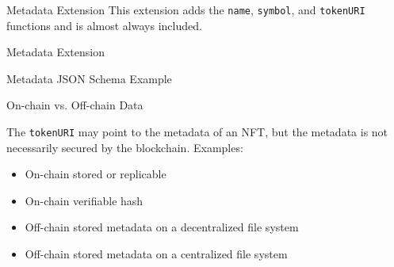 \documentclass[handout]{beamer}
\begin{document}
\begin{frame}{Metadata Extension}
	This extension adds the \texttt{name}, \texttt{symbol}, and \texttt{tokenURI} functions and is almost always included.
\vspace{0.5em}
	\begin{samplecode}{Metadata Extension}
		
	\end{samplecode}
\end{frame}

\begin{frame}{Metadata JSON Schema Example}
%
\end{frame}

\begin{frame}{On-chain vs. Off-chain Data}

	The \texttt{tokenURI} may point to the metadata of an NFT, but the metadata is not necessarily secured by the blockchain. Examples:\\

	\begin{itemize}
		\item<2-> On-chain stored or replicable
		\item<2-> On-chain verifiable hash
		\item<2-> Off-chain stored metadata on a decentralized file system
		\item<2-> Off-chain stored metadata on a centralized file system
	\end{itemize}
\end{frame}
\end{document}
